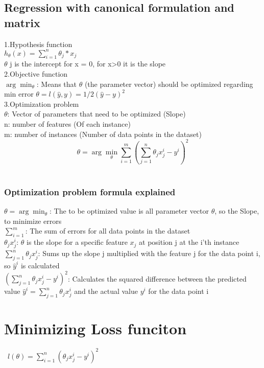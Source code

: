 \documentclass{article}
\begin{document}
\subsection{Regression with canonical formulation and matrix}
1.Hypothesis function \\ 
$h_\theta(x) = \sum_{i=1}^{n} \theta_j * x_j$ \\
$\theta$ j is the intercept for x = 0, for x>0 it is the slope \\
2.Objective function \\
$\arg\min_{\theta}$: Means that $ \theta$ (the parameter vector) should be optimized regarding min error
$  \theta = l(\hat{y}, y) =  1/2 (\hat{y}-y)^2$ \\ 
3.Optimization problem \\
$\theta$: Vector of parameters that need to be optimized (Slope) \\
n: number of features (Of each instance) \\ 
m: number of instances (Number of data points in the dataset) \\

\[
\theta = \arg\min_{\theta} \sum_{i=1}^{m} \left( \sum_{j=1}^{n} \theta_j x_j^i - y^i \right)^2
\] \\ 
\subsubsection{Optimization problem formula explained}
$\theta = \arg\min_{\theta}$: The to be optimized value is all parameter vector $\theta$, so the Slope, to minimize errors\\
$\sum_{i=1}^{m}$: The sum of errors for all data points in the dataset \\ 
$\theta_j x_j^i$: $\theta$ is the slope for a specific feature $x_j$ at position j at the i'th instance \\ 
$\sum_{j=1}^{n}\theta_j x_j^i$: Sums up the slope j multiplied with the feature j for the data point i, so $\hat{y}^i$ is calculated\\ 
$( \sum_{j=1}^{n} \theta_j x_j^i - y^i)^2$: Calculates the squared difference between the predicted value $\hat{y}^i = \sum_{j=1}^{n}\theta_j x_j^i$ and the actual value $y^i$ for the data point i

\section{Minimizing Loss funciton}\
$l(\theta ) = \sum_{i=1}^{n} (\theta_j x_j^i - y^i)^2$
\end{document}
